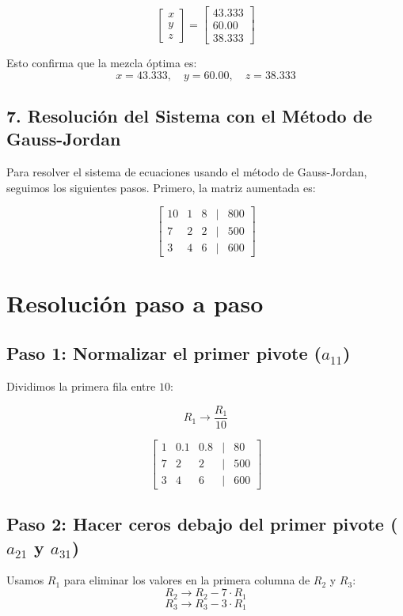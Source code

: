 \documentclass[]{article}
\begin{document}
	\[
	\begin{bmatrix}
		x \\
		y \\
		z
	\end{bmatrix}
	=
	\begin{bmatrix}
		43.333 \\
		60.00 \\
		38.333
	\end{bmatrix}
	\]
	
	Esto confirma que la mezcla óptima es:
	\[
	x = 43.333, \quad y = 60.00, \quad z = 38.333
	\]
	
	\subsection*{7. Resolución del Sistema con el Método de Gauss-Jordan}
	Para resolver el sistema de ecuaciones usando el método de Gauss-Jordan, seguimos los siguientes pasos. Primero, la matriz aumentada es:
	
\[
\begin{bmatrix}
	10 & 1 & 8 & | & 800 \\
	7 & 2 & 2 & | & 500 \\
	3 & 4 & 6 & | & 600
\end{bmatrix}
\]

\section*{Resolución paso a paso}

\subsection*{Paso 1: Normalizar el primer pivote (\(a_{11}\))}

Dividimos la primera fila entre \(10\):

\[
R_1 \rightarrow \frac{R_1}{10}
\]

\[
\begin{bmatrix}
	1 & 0.1 & 0.8 & | & 80 \\
	7 & 2 & 2 & | & 500 \\
	3 & 4 & 6 & | & 600
\end{bmatrix}
\]

\subsection*{Paso 2: Hacer ceros debajo del primer pivote (\(a_{21}\) y \(a_{31}\))}

Usamos \(R_1\) para eliminar los valores en la primera columna de \(R_2\) y \(R_3\):
\[
R_2 \rightarrow R_2 - 7 \cdot R_1
\]
\[
R_3 \rightarrow R_3 - 3 \cdot R_1
\]
\end{document}
